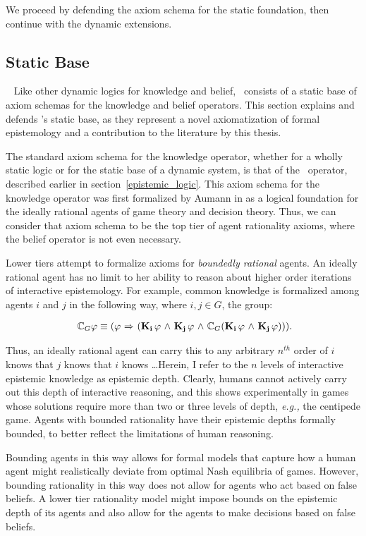 We proceed by defending the axiom schema for the static foundation, then continue with the dynamic extensions.

\subsection{Static Base}~\label{static}
Like other dynamic logics for knowledge and belief, \DASL\ consists of a static base of axiom schemas for the knowledge and belief operators. This section explains and defends \DASL's static base, as they represent a novel axiomatization of formal epistemology and a contribution to the literature by this thesis. 

The standard axiom schema for the knowledge operator, whether for a wholly static logic or for the static base of a dynamic system, is that of the \SFive\ operator, described earlier in section~\ref{epistemic_logic}. This axiom schema for the knowledge operator was first formalized by Aumann in \cite{Aumann} as a logical foundation for the ideally rational agents of game theory and decision theory. Thus, we can consider that axiom schema to be the top tier of agent rationality axioms, where the belief operator is not even necessary.

Lower tiers attempt to formalize axioms for \emph{boundedly rational} agents. An ideally rational agent has no limit to her ability to reason about higher order iterations of interactive epistemology. For example, common knowledge is formalized among agents $i$ and $j$ in the following way, where $i,j\in G$, the group:

\begin{eqnarray}~\label{common_knowledge}
	\mathbb{C}_{G}\varphi \equiv (\varphi {\ \Rightarrow \ } (\mathbf{K}_{\mathbf{i}}\,\varphi {\ \wedge \ } \mathbf{K}_{\mathbf{j}}\,\varphi {\ \wedge \ } \mathbb{C}_{G}(\mathbf{K}_{\mathbf{i}}\,\varphi {\ \wedge \ } \mathbf{K}_{\mathbf{j}}\,\varphi))).
\end{eqnarray}

Thus, an ideally rational agent can carry this to any arbitrary $\mathit{n^{th}}$ order of $i$ knows that $j$ knows that $i$ knows \dots Herein, I refer to the $n$ levels of interactive epistemic knowledge as epistemic depth. Clearly, humans cannot actively carry out this depth of interactive reasoning, and this shows experimentally in games whose solutions require more than two or three levels of depth, \emph{e.g.,} the centipede game. Agents with bounded rationality have their epistemic depths formally bounded, to better reflect the limitations of human reasoning.

Bounding agents in this way allows for formal models that capture how a human agent might realistically deviate from optimal Nash equilibria of games. However, bounding rationality in this way does not allow for agents who act based on false beliefs. A lower tier rationality model might impose bounds on the epistemic depth of its agents and also allow for the agents to make decisions based on false beliefs.

